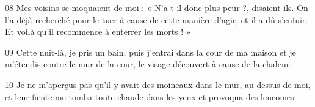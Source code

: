 
08 Mes voisins se moquaient de moi : « N’a-t-il donc plus peur ?, disaient-ils. On l’a déjà recherché pour le tuer à cause de cette manière d’agir, et il a dû s’enfuir. Et voilà qu’il recommence à enterrer les morts ! »

09 Cette nuit-là, je pris un bain, puis j’entrai dans la cour de ma maison et je m’étendis contre le mur de la cour, le visage découvert à cause de la chaleur.

10 Je ne m’aperçus pas qu’il y avait des moineaux dans le mur, au-dessus de moi, et leur fiente me tomba toute chaude dans les yeux et provoqua des leucomes.